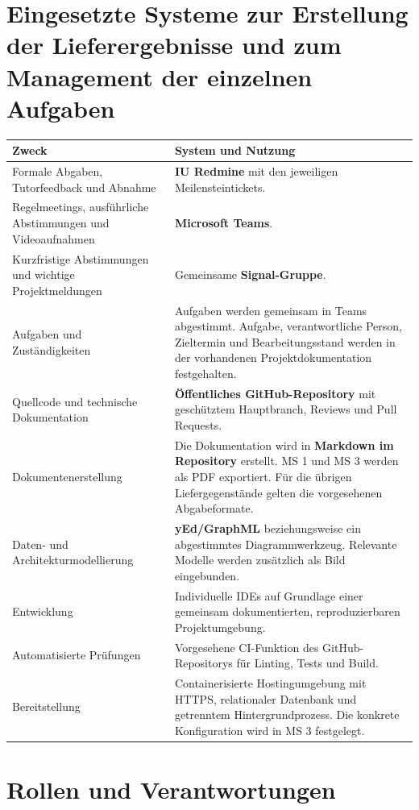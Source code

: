 \documentclass[11pt,a4paper]{article}
\begin{document}
\section{Eingesetzte Systeme zur Erstellung der Lieferergebnisse und zum Management der einzelnen Aufgaben}

\begin{tabularx}{\linewidth}{@{}p{5.2cm} Y@{}}
\toprule
\textbf{Zweck} & \textbf{System und Nutzung} \\
\midrule
Formale Abgaben, Tutorfeedback und Abnahme & \textbf{IU Redmine} mit den jeweiligen Meilensteintickets. \\
Regelmeetings, ausführliche Abstimmungen und Videoaufnahmen & \textbf{Microsoft Teams}. \\
Kurzfristige Abstimmungen und wichtige Projektmeldungen & Gemeinsame \textbf{Signal-Gruppe}. \\
Aufgaben und Zuständigkeiten & Aufgaben werden gemeinsam in Teams abgestimmt. Aufgabe, verantwortliche Person, Zieltermin und Bearbeitungsstand werden in der vorhandenen Projektdokumentation festgehalten. \\
Quellcode und technische Dokumentation & \textbf{Öffentliches GitHub-Repository} mit geschütztem Hauptbranch, Reviews und Pull Requests. \\
Dokumentenerstellung & Die Dokumentation wird in \textbf{Markdown im Repository} erstellt. MS 1 und MS 3 werden als PDF exportiert. Für die übrigen Liefergegenstände gelten die vorgesehenen Abgabeformate. \\
Daten- und Architekturmodellierung & \textbf{yEd/GraphML} beziehungsweise ein abgestimmtes Diagrammwerkzeug. Relevante Modelle werden zusätzlich als Bild eingebunden. \\
Entwicklung & Individuelle IDEs auf Grundlage einer gemeinsam dokumentierten, reproduzierbaren Projektumgebung. \\
Automatisierte Prüfungen & Vorgesehene CI-Funktion des GitHub-Repositorys für Linting, Tests und Build. \\
Bereitstellung & Containerisierte Hostingumgebung mit HTTPS, relationaler Datenbank und getrenntem Hintergrundprozess. Die konkrete Konfiguration wird in MS 3 festgelegt. \\
\bottomrule
\end{tabularx}

\section{Rollen und Verantwortungen}
\end{document}
